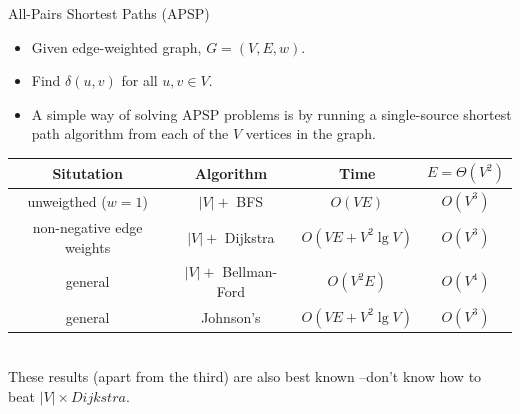 \documentclass{beamer}
\begin{document}
\begin{frame}{All-Pairs Shortest Paths (APSP)}
    \begin{itemize}
        \item Given edge-weighted graph, $G = (V, E, w)$.
        \item Find $\delta(u, v)$ for all $u, v \in V$.
        \item A simple way of solving APSP problems is by running a single-source shortest path algorithm from each of the $V$ vertices in the graph.
    \end{itemize}\pause
    \bigskip
    \tiny
    \centering
    \begin{tabular}{ c | c | c | c}
        \textbf{Situtation}         & \textbf{Algorithm}    & \textbf{Time}         & $E=\Theta(V^2)$ \\ \hline
        unweigthed ($w = 1$)        & $|V| + $ BFS          & $O(V E)$              & $O(V^3)$ \\
        non-negative edge weights   & $|V| + $ Dijkstra     & $O(V E + V^2 \lg V)$  & $O(V^3)$ \\
        general                     & $|V| + $ Bellman-Ford & $O(V^2 E)$            & $O(V^4)$ \\
        general                     & Johnson’s             & $O(V E + V^2 \lg V)$  & $O(V^3)$ \\
    \end{tabular}\\
    \bigskip
    \footnotesize
    These results (apart from the third) are also best known --don’t know how to beat $|V| \times Dijkstra$.
\end{frame}
\end{document}
